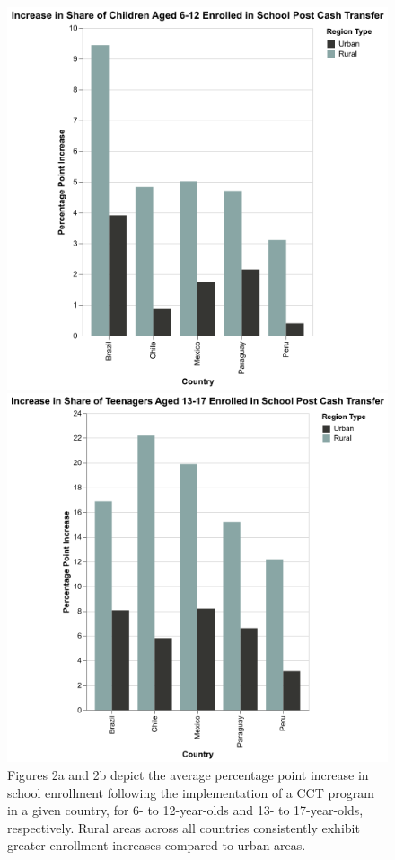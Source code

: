 \documentclass[
  10pt,
]{article}
\begin{document}
\begin{figure}

\begin{minipage}{0.50\linewidth}
\includegraphics{Graphs/change_enrollment6_12yo.png}\end{minipage}%
%
\begin{minipage}{0.50\linewidth}
\includegraphics{Graphs/change_enrollment13_17yo.png}\end{minipage}%

\caption{\label{fig-combined}Figures 2a and 2b depict the average
percentage point increase in school enrollment following the
implementation of a CCT program in a given country, for 6- to
12-year-olds and 13- to 17-year-olds, respectively. Rural areas across
all countries consistently exhibit greater enrollment increases compared
to urban areas.}

\end{figure}%
\end{document}
